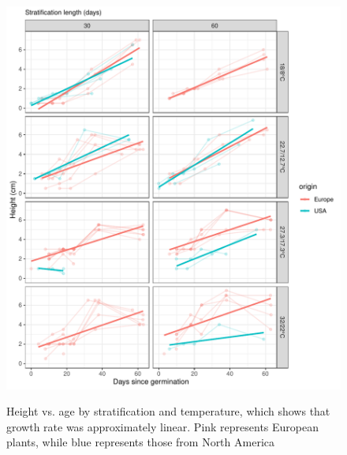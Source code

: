 \documentclass[12pt]{article}\usepackage[]{graphicx}\usepackage[]{color}
\begin{document}
\begin{figure}[H]
  {\includegraphics[scale=.5, page=7, trim=0cm 0cm 0cm 0cm, clip=TRUE]{supplement.pdf}}
  \caption{Height vs. age by stratification and temperature, which shows that growth rate was approximately linear.  Pink represents European plants, while blue represents those from  North America \label{fig:lmgr}}
\end{figure}
\end{document}
